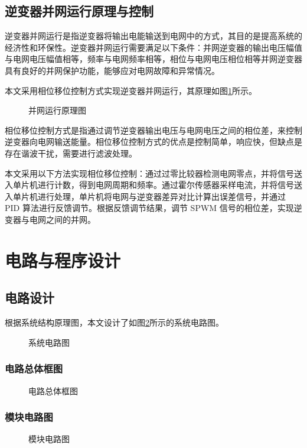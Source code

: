 \documentclass[a4paper,12pt]{article}
\begin{document}
\subsection{逆变器并网运行原理与控制}
逆变器并网运行是指逆变器将输出电能输送到电网中的方式，其目的是提高系统的经济性和环保性。逆变器并网运行需要满足以下条件：并网逆变器的输出电压幅值与电网电压幅值相等，频率与电网频率相等，相位与电网电压相位相等并网逆变器具有良好的并网保护功能，能够应对电网故障和异常情况。


本文采用相位移位控制方式实现逆变器并网运行，其原理如图\ref{fig4}所示。
\begin{figure}
\centering
\caption{并网运行原理图}
\label{fig4}
\end{figure}


相位移位控制方式是指通过调节逆变器输出电压与电网电压之间的相位差，来控制逆变器向电网输送能量。相位移位控制方式的优点是控制简单，响应快，但缺点是存在谐波干扰，需要进行滤波处理。


本文采用以下方法实现相位移位控制：通过过零比较器检测电网零点，并将信号送入单片机进行计数，得到电网周期和频率。通过霍尔传感器采样电流，并将信号送入单片机进行处理，单片机将电网与逆变器差异对比计算出误差信号，并通过 PID 算法进行反馈调节。根据反馈调节结果，调节 SPWM 信号的相位差，实现逆变器与电网之间的并网。


\newpage

\section{电路与程序设计}
\subsection{电路设计}
根据系统结构原理图，本文设计了如图\ref{fig5}所示的系统电路图。
\begin{figure}
\centering
\caption{系统电路图}
\label{fig5}
\end{figure}

\subsubsection{电路总体框图}
\begin{figure}
\centering
\caption{电路总体框图}
\end{figure}

\subsubsection{模块电路图}
\begin{figure}
\centering
\caption{模块电路图}
\end{figure}
\end{document}
